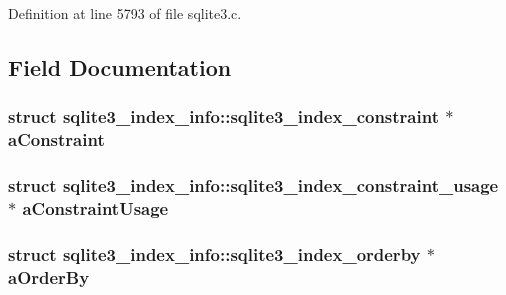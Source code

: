 Definition at line 5793 of file sqlite3.\+c.



\subsection{Field Documentation}
\hypertarget{structsqlite3__index__info_a4896ff0e5406c7a3679fb23e51ad1061}{}
\subsubsection[{a\+Constraint}]{\setlength{\rightskip}{0pt plus 5cm}struct {\bf sqlite3\+\_\+index\+\_\+info\+::sqlite3\+\_\+index\+\_\+constraint} $\ast$ a\+Constraint}\label{structsqlite3__index__info_a4896ff0e5406c7a3679fb23e51ad1061}
\hypertarget{structsqlite3__index__info_a10451bff64af6d6733c34cc2654fec91}{}
\subsubsection[{a\+Constraint\+Usage}]{\setlength{\rightskip}{0pt plus 5cm}struct {\bf sqlite3\+\_\+index\+\_\+info\+::sqlite3\+\_\+index\+\_\+constraint\+\_\+usage} $\ast$ a\+Constraint\+Usage}\label{structsqlite3__index__info_a10451bff64af6d6733c34cc2654fec91}
\hypertarget{structsqlite3__index__info_a60db554cfbdaf31800eb333aee3e6f1e}{}
\subsubsection[{a\+Order\+By}]{\setlength{\rightskip}{0pt plus 5cm}struct {\bf sqlite3\+\_\+index\+\_\+info\+::sqlite3\+\_\+index\+\_\+orderby} $\ast$ a\+Order\+By}\label{structsqlite3__index__info_a60db554cfbdaf31800eb333aee3e6f1e}
\hypertarget{structsqlite3__index__info_ade68ab576208e4d8be52f13f5b3f9c19}{}
